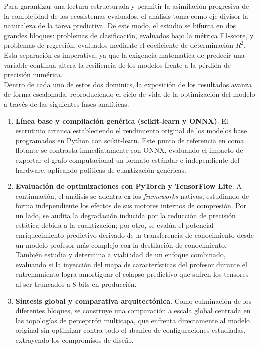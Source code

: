 \documentclass[a4paper,12pt,twoside,final]{book}
\begin{document}
Para garantizar una lectura estructurada y permitir la asimilación progresiva de la complejidad de los ecosistemas
evaluados, el análisis toma como eje divisor la naturaleza de la tarea predictiva. De este modo, el estudio se bifurca
en dos grandes bloques: problemas de clasificación, evaluados bajo la métrica F1-score, y problemas de regresión,
evaluados mediante el coeficiente de determinación $R^2$. Esta separación es imperativa, ya que la exigencia
matemática de predecir una variable continua altera la resiliencia de los modelos frente a la pérdida de precisión
numérica.\\

Dentro de cada uno de estos dos dominios, la exposición de los resultados avanza de forma escalonada, reproduciendo el
ciclo de vida de la optimización del modelo a través de las siguientes fases analíticas.
\begin{enumerate}
  \item \textbf{Línea base y compilación genérica (scikit-learn y ONNX)}. El escrutinio arranca estableciendo
  el rendimiento original de los modelos base programados en Python con scikit-learn. Este punto de referencia en coma
  flotante se contrasta inmediatamente con ONNX, evaluando el impacto de exportar el grafo computacional un formato
  estándar e independiente del hardware, aplicando políticas de cuantización genéricas.
  \item \textbf{Evaluación de optimizaciones con PyTorch y TensorFlow Lite}. A continuación, el análisis se
  adentra en los \textit{frameworks} nativos, estudiando de forma independiente los efectos de sus motores internos de
  compresión. Por un lado, se audita la degradación inducida por la reducción de precisión estática debida a la
  cuantización; por otro, se evalúa el potencial enriquecimiento predictivo derivado de la transferencia de conocimiento
  desde un modelo profesor más complejo con la destilación de conocimiento. También estudia y determina a viabilidad de
  un enfoque combinado, evaluando si la inyección del mapa de características del profesor durante el entrenamiento
  logra amortiguar el colapso predictivo que sufren los tensores al ser truncados a 8 bits en producción.
  \item \textbf{Síntesis global y comparativa arquitectónica}. Como culminación de los diferentes bloques, se construye
  una comparación a escala global centrada en las topologías de perceptrón multicapa, que enfrenta directamente al
  modelo original sin optimizar contra todo el abanico de configuraciones estudiadas, extrayendo los compromisos de
  diseño.
\end{enumerate}
\end{document}
